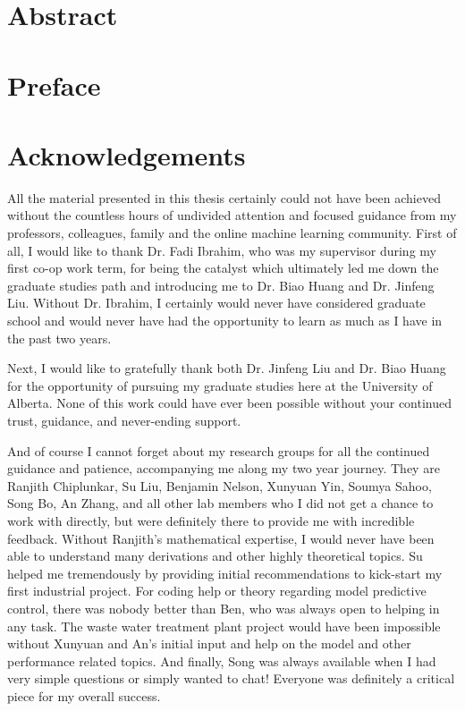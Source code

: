 \documentclass[12pt]{report}
\begin{document}
\chapter*{Abstract}

\chapter*{Preface}

\tableofcontents
\listoffigures
\listoftables

\chapter*{Acknowledgements}
All the material presented in this thesis certainly could not have been achieved without the countless hours of undivided attention and focused guidance from my professors, colleagues, family and the online machine learning community. First of all, I would like to thank Dr. Fadi Ibrahim, who was my supervisor during my first co-op work term, for being the catalyst which ultimately led me down the graduate studies path and introducing me to Dr. Biao Huang and Dr. Jinfeng Liu. Without Dr. Ibrahim, I certainly would never have considered graduate school and would never have had the opportunity to learn as much as I have in the past two years.  

Next, I would like to gratefully thank both Dr. Jinfeng Liu and Dr. Biao Huang for the opportunity of pursuing my graduate studies here at the University of Alberta.  None of this work could have ever been possible without your continued trust, guidance, and never-ending support.

And of course I cannot forget about my research groups for all the continued guidance and patience, accompanying me along my two year journey.  They are Ranjith Chiplunkar, Su Liu, Benjamin Nelson, Xunyuan Yin, Soumya Sahoo, Song Bo, An Zhang, and all other lab members who I did not get a chance to work with directly, but were definitely there to provide me with incredible feedback.  Without Ranjith's mathematical expertise, I would never have been able to understand many derivations and other highly theoretical topics.  Su helped me tremendously by providing initial recommendations to kick-start my first industrial project.  For coding help or theory regarding model predictive control, there was nobody better than Ben, who was always open to helping in any task. The waste water treatment plant project would have been impossible without Xunyuan and An's initial input and help on the model and other performance related topics.  And finally, Song was always available when I had very simple questions or simply wanted to chat!  Everyone was definitely a critical piece for my overall success.  
\end{document}
